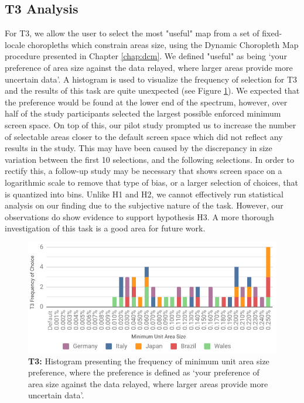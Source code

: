 \subsection{T3 Analysis}
For T3, we allow the user to select the most "useful" map from a set of fixed-locale choropleths which constrain areas size, using the Dynamic Choropleth Map procedure presented in Chapter \ref{chap:dcm}. We defined "useful" as being `your preference of area size against the data relayed, where larger areas provide more uncertain data'. A histogram is used to visualize the frequency of selection for T3 and the results of this task are quite unexpected (see Figure \ref{fig:t3results}).  We expected that the preference would be found at the lower end of the spectrum, however, over half of the study participants selected the largest possible enforced minimum screen space. On top of this, our pilot study prompted us to increase the number of selectable areas closer to the default screen space which did not reflect any results in the study. This may have been caused by the discrepancy in size variation between the first 10 selections, and the following selections. In order to rectify this, a follow-up study may be necessary that shows screen space on a logarithmic scale to remove that type of bias, or a larger selection of choices, that is quantized into bins. Unlike H1 and H2, we cannot effectively run statistical analysis on our finding due to the subjective nature of the task. However, our observations do show evidence to support hypothesis H3. A more thorough investigation of this task is a good area for future work.
\begin{figure}[t]
\centering
\includegraphics[width=1\linewidth]{images/T3}
\caption{\textbf{T3:} Histogram presenting the frequency of minimum unit area size preference, where the preference is defined as `your preference of area size against the data relayed, where larger areas provide more uncertain data'.} \label{fig:t3results} \vspace{-0.8cm}
\end{figure}

